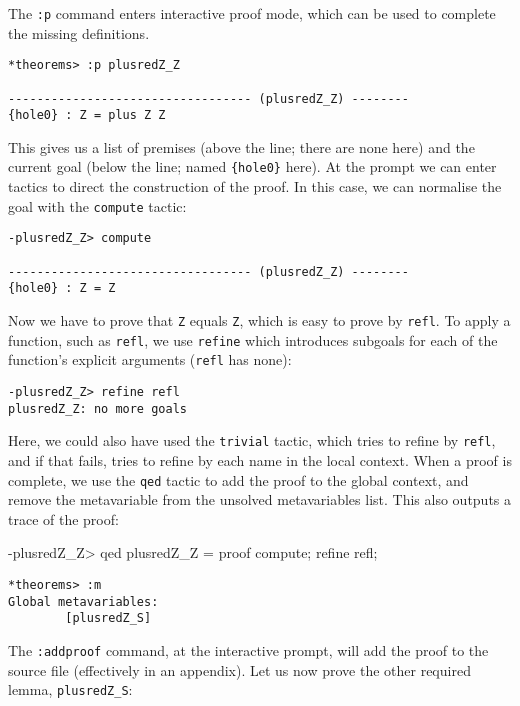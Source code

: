 \noindent
The \texttt{:p} command enters interactive proof mode, which can be used to complete the missing definitions.

\begin{lstlisting}[style=stdout]
*theorems> :p plusredZ_Z

---------------------------------- (plusredZ_Z) --------
{hole0} : Z = plus Z Z
\end{lstlisting}

\noindent
This gives us a list of premises (above the line; there are none here) and the current goal (below the line; named \texttt{\{hole0\}} here).
At the prompt we can enter tactics to direct the construction of the proof.
In this case, we can normalise the goal with the \texttt{compute} tactic:

\begin{lstlisting}[style=stdout]
-plusredZ_Z> compute

---------------------------------- (plusredZ_Z) --------
{hole0} : Z = Z
\end{lstlisting}

\noindent
Now we have to prove that \texttt{Z} equals \texttt{Z}, which is easy to prove by \texttt{refl}.
To apply a function, such as \texttt{refl}, we use \texttt{refine} which introduces subgoals for each of the function's explicit arguments (\texttt{refl} has none):

\begin{lstlisting}[style=stdout]
-plusredZ_Z> refine refl
plusredZ_Z: no more goals
\end{lstlisting}

\noindent
Here, we could also have used the \texttt{trivial} tactic, which tries to refine by \texttt{refl}, and if that fails, tries to refine by each name in the local context.
When a proof is complete, we use the \texttt{qed} tactic to add the proof to the global context, and remove the metavariable from the unsolved metavariables list.
This also outputs a trace of the proof:

\begin{code}
-plusredZ_Z> qed
plusredZ_Z = proof {
    compute;
    refine refl;
}
\end{code}

\begin{lstlisting}[style=stdout]
*theorems> :m
Global metavariables:
        [plusredZ_S]
\end{lstlisting}

\noindent
The \texttt{:addproof} command, at the interactive prompt, will add the proof to the source file (effectively in an appendix).
Let us now prove the other required lemma, \texttt{plusredZ\_S}:

